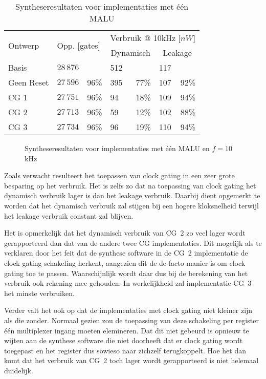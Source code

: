 \begin{table}[h]
	\caption{Syntheseresultaten voor implementaties met \'e\'en MALU}
	\label{tabel-resultaten-optimalisaties}

	\centering
	\begin{tabular}{llrlrlr}
		\toprule
		\multirow{2}{*}{Ontwerp}	& \multicolumn{2}{l}{\multirow{2}{*}{Opp. [gates]}}	& \multicolumn{4}{c}{Verbruik @ 10kHz [$nW$]}\\
		\cmidrule{4-7}
		&	& & \multicolumn{2}{c}{Dynamisch}	& \multicolumn{2}{c}{Leakage}\\
		\midrule
		Basis			& $28\,876$	& 			& 512	&	 		& 117 & \\
		Geen Reset	& $27\,596$	& 96\%	& 395	& 77\%	& 107 & 92\%\\
		CG 1			& $27\,751$	& 96\%	& 94	& 18\%	& 109	& 94\%\\
		CG 2			& $27\,713$	& 96\%	& 59	& 12\%	& 102	& 88\%\\
		CG 3			& $27\,734$	& 96\%	& 96	& 19\%	& 110	& 94\%\\
		\bottomrule		
	\end{tabular}
\end{table}

\begin{figure}[h]
	\centering
		\caption{Syntheseresultaten voor implementaties met \'e\'en MALU en $f = 10$kHz\label{figuur-resultaten-m1}}
\end{figure}

Zoals verwacht resulteert het toepassen van clock gating in een zeer grote besparing op het verbruik. Het is zelfs zo dat na toepassing van clock gating het dynamisch verbruik lager is dan het leakage verbruik. Daarbij dient opgemerkt te worden dat het dynamisch verbruik zal stijgen bij een hogere kloksnelheid terwijl het leakage verbruik constant zal blijven.

Het is opmerkelijk dat het dynamisch verbruik van CG~2 zo veel lager wordt gerapporteerd dan dat van de andere twee CG implementaties. Dit mogelijk als te verklaren door het feit dat de synthese software in de CG~2 implementatie de clock gating schakeling herkent, aangezien dit de de facto manier is om clock gating toe te passen. Waarschijnlijk wordt daar dus bij de berekening van het verbruik ook rekening mee gehouden. In werkelijkheid zal implementatie CG~3 het minste verbruiken.

Verder valt het ook op dat de implementaties met clock gating niet kleiner zijn als die zonder. Normaal gezien zou de toepassing van deze schakeling per register \'e\'en multiplexer ingang moeten elemineren. Dat dit niet gebeurd is opnieuw te wijten aan de synthese software die niet doorheeft dat er clock gating wordt toegepast en het register dus sowieso naar zichzelf terugkoppelt. Hoe het dan komt dat het verbruik van CG~2 toch lager wordt gerapporteerd is niet helemaal duidelijk.

